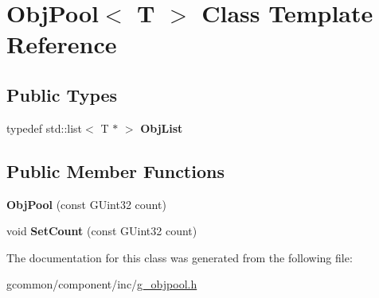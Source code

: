 \hypertarget{class_obj_pool}{\section{Obj\-Pool$<$ T $>$ Class Template Reference}
\label{class_obj_pool}
}
\subsection*{Public Types}
\begin{DoxyCompactItemize}
\item 
\hypertarget{class_obj_pool_a14ab448fcb58c1034e3be9edbc83944b}{typedef std\-::list$<$ T $\ast$ $>$ {\bfseries Obj\-List}}\label{class_obj_pool_a14ab448fcb58c1034e3be9edbc83944b}

\end{DoxyCompactItemize}
\subsection*{Public Member Functions}
\begin{DoxyCompactItemize}
\item 
\hypertarget{class_obj_pool_a948b87fdb2e1d9da7dc3fbe6cdad3eee}{{\bfseries Obj\-Pool} (const G\-Uint32 count)}\label{class_obj_pool_a948b87fdb2e1d9da7dc3fbe6cdad3eee}

\item 
\hypertarget{class_obj_pool_ac6f6371ceacc6ec599215bc705ee8bfc}{void {\bfseries Set\-Count} (const G\-Uint32 count)}\label{class_obj_pool_ac6f6371ceacc6ec599215bc705ee8bfc}

\end{DoxyCompactItemize}


The documentation for this class was generated from the following file\-:\begin{DoxyCompactItemize}
\item 
gcommon/component/inc/\hyperlink{g__objpool_8h}{g\-\_\-objpool.\-h}\end{DoxyCompactItemize}
